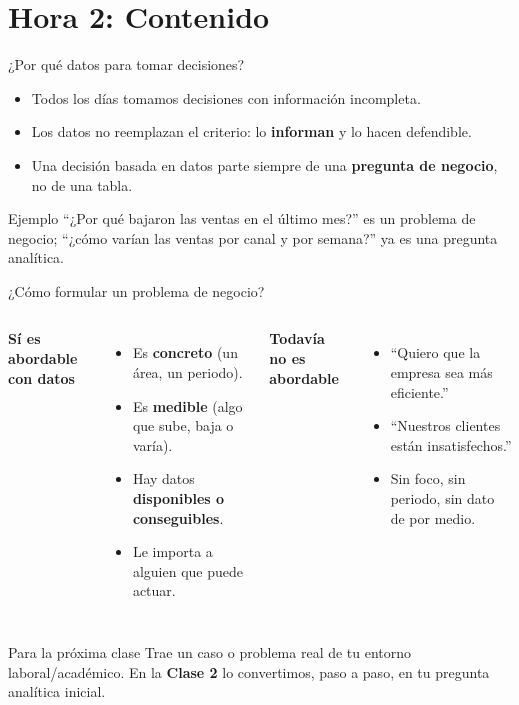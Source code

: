 \documentclass[aspectratio=169,11pt]{beamer}
\begin{document}
\section{Hora 2: Contenido}
\begin{frame}{¿Por qué datos para tomar decisiones?}
  \begin{itemize}
    \item Todos los días tomamos decisiones con información incompleta.
    \item Los datos no reemplazan el criterio: lo \textbf{informan} y lo hacen defendible.
    \item Una decisión basada en datos parte siempre de una \textbf{pregunta de negocio}, no de una tabla.
  \end{itemize}
  \begin{exampleblock}{Ejemplo}
    ``¿Por qué bajaron las ventas en el último mes?'' es un problema de negocio;
    ``¿cómo varían las ventas por canal y por semana?'' ya es una pregunta analítica.
  \end{exampleblock}
\end{frame}

\begin{frame}{¿Cómo formular un problema de negocio?}
  \begin{columns}[T,onlytextwidth]
    \textbf{Sí es abordable con datos}
    \begin{itemize}
      \small
      \item Es \textbf{concreto} (un área, un periodo).
      \item Es \textbf{medible} (algo que sube, baja o varía).
      \item Hay datos \textbf{disponibles o conseguibles}.
      \item Le importa a alguien que puede actuar.
    \end{itemize}
    \textbf{Todavía no es abordable}
    \begin{itemize}
      \small
      \item ``Quiero que la empresa sea más eficiente.''
      \item ``Nuestros clientes están insatisfechos.''
      \item Sin foco, sin periodo, sin dato de por medio.
    \end{itemize}
  \end{columns}
  \begin{alertblock}{Para la próxima clase}
    \small Trae un caso o problema real de tu entorno laboral/académico.
    En la \textbf{Clase 2} lo convertimos, paso a paso, en tu pregunta
    analítica inicial.
  \end{alertblock}
\end{frame}
\end{document}
